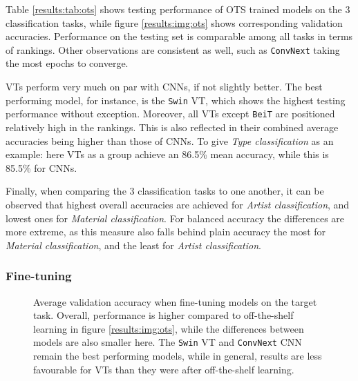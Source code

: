 Table \ref{results:tab:ots} shows testing performance of OTS trained models on the 3 classification tasks, while figure \ref{results:img:ots} shows corresponding validation accuracies. Performance on the testing set is comparable among all tasks in terms of rankings. Other observations are consistent as well, such as \texttt{ConvNext} taking the most epochs to converge.

VTs perform very much on par with CNNs, if not slightly better. The best performing model, for instance, is the \texttt{Swin} VT, which shows the highest testing performance without exception. Moreover, all VTs except \texttt{BeiT} are positioned relatively high in the rankings. This is also reflected in their combined average accuracies being higher than those of CNNs. To give \textit{Type classification} as an example: here VTs as a group achieve an 86.5\% mean accuracy, while this is 85.5\% for CNNs.

Finally, when comparing the 3 classification tasks to one another, it can be observed that highest overall accuracies are achieved for \textit{Artist classification}, and lowest ones for \textit{Material classification}. For balanced accuracy the differences are more extreme, as this measure also falls behind plain accuracy the most for \textit{Material classification}, and the least for \textit{Artist classification}.



\subsubsection{Fine-tuning} \label{results:ft}

\begin{figure}[tb]
    \centering
    \def\svgwidth{\textwidth}
    
    \caption{Average validation accuracy when fine-tuning models on the target task. Overall, performance is higher compared to off-the-shelf learning in figure \ref{results:img:ots}, while the differences between models are also smaller here. The \texttt{Swin} VT and \texttt{ConvNext} CNN remain the best performing models, while in general, results are less favourable for VTs than they were after off-the-shelf learning.}
    \label{results:img:ft}
\end{figure}

